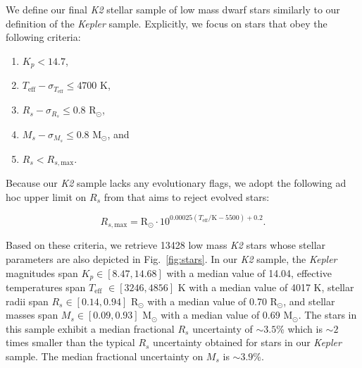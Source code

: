 \documentclass[twocolumn]{emulateapj}
\newcommand{\kepler}[1]{\emph{Kepler}#1}
\newcommand{\ktwo}[1]{\emph{K2}#1}
\newcommand{\teff}[1]{$T_{\text{eff}}$#1}
\begin{document}
We define our final \ktwo{} stellar sample of low mass dwarf stars similarly to our definition of the \kepler{} sample.
Explicitly, we focus on stars that obey the following criteria:

\begin{enumerate}
\item $K_p < 14.7$,
\item $T_{\text{eff}} - \sigma_{T_{\text{eff}}} \leq 4700$ K,
\item $R_s - \sigma_{R_s} \leq 0.8$ R$_{\odot}$,
\item $M_s - \sigma_{M_s} \leq 0.8$ M$_{\odot}$, and
\item $R_s < R_{s,\text{max}}$.
\end{enumerate}

\noindent Because our \ktwo{} sample lacks any evolutionary flags, we adopt the following ad hoc upper limit on $R_s$
from \cite{fulton17} that aims to reject evolved stars:

\begin{equation}
  R_{s,\text{max}} = \text{R}_{\odot} \cdot 10^{0.00025(T_{\text{eff}}/\text{K}-5500)+0.2}.
\end{equation}

\noindent Based on these criteria, we retrieve 13428 low mass \ktwo{} stars whose
stellar parameters are also depicted in Fig.~\ref{fig:stars}.
In our \ktwo{} sample, the \kepler{} magnitudes span $K_p \in [8.47, 14.68]$ with a median value of 14.04,
effective temperatures span \teff{} $\in [3246, 4856]$ K with a median value of 4017 K,
stellar radii span $R_s \in [0.14, 0.94]$ R$_{\odot}$ with a median value of 0.70 R$_{\odot}$, and
stellar masses span $M_s \in [0.09, 0.93]$ M$_{\odot}$ with a median value of 0.69 M$_{\odot}$.
The stars in this sample exhibit a median fractional $R_s$ uncertainty of $\sim 3.5$\% which is $\sim 2$
times smaller than the typical $R_s$ uncertainty obtained for stars in our \kepler{} sample.
The median fractional uncertainty on $M_s$ is $\sim 3.9$\%.
\end{document}
